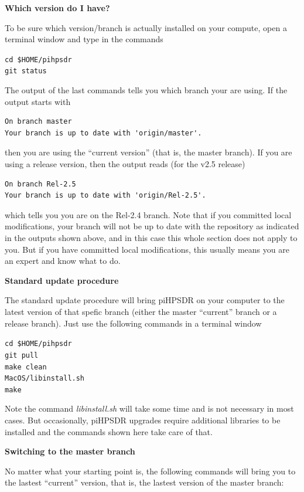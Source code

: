 \documentclass[12pt]{book}
\def\grtt#1{\texttt{\color{magenta}#1}}
\def\pH{pi\-HPSDR\xspace}
\begin{document}
\medskip
\textbf{Which version do I have?}

To be sure which version/branch is actually installed on your compute, open a terminal  window and
type in the commands

\grtt{cd \$HOME/pihpsdr} \\
\grtt{git status}

The output of the last commands tells you which branch your are using. If the output starts
with

\begin{verbatim}
On branch master
Your branch is up to date with 'origin/master'.
\end{verbatim}

then you are using the ``current version'' (that is, the master branch). If you are using a release
version, then the output reads (for the v2.5 release)

\begin{verbatim}
On branch Rel-2.5
Your branch is up to date with 'origin/Rel-2.5'.
\end{verbatim}

which tells you you are on the Rel-2.4 branch. Note that if you committed local modifications,
your branch will not be up to date with the repository as indicated in the outputs shown above,
and in this case this whole section does  not apply  to you. But if you have committed  local
modifications, this usually means you are an expert and know what to do.

\medskip
\textbf{Standard update procedure}

The standard update procedure will bring \pH on your computer to the latest version of
that spefic branch (either the master ``current'' branch or a release branch).
Just use the following commands in a terminal window

\grtt{cd \$HOME/pihpsdr} \\
\grtt{git pull} \\
\grtt{make clean} \\
\grtt{MacOS/libinstall.sh} \\
\grtt{make}

Note the command \textit{libinstall.sh} will take some time and is not necessary in most cases. But occasionally,
\pH upgrades require additional libraries to be installed and the commands shown here take care of that.

\medskip
\textbf{Switching to the master branch}

No matter what your starting point is, the following commands will bring you to the
lastest ``current'' version, that is, the lastest version of the master branch:
\end{document}
